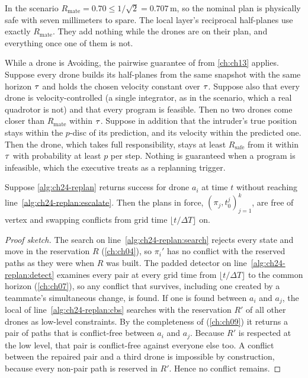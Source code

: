 In the scenario $R_{\mathrm{mate}} = 0.70 \le 1/\sqrt{2} = 0.707$\,m, so the
nominal plan is physically safe with seven millimeters to spare. The local
layer's reciprocal half-planes use exactly $R_{\mathrm{mate}}$. They add
nothing while the drones are on their plan, and everything once one of them
is not.

\begin{proposition}
\label{thm:ch24-orca}
While a drone is Avoiding, the pairwise guarantee of \orca
\cite{vandenberg2011orca} from \cref{ch:ch13} applies. Suppose every drone
builds its half-planes from the same snapshot with the same horizon $\tau$
and holds the chosen velocity constant over $\tau$. Suppose also that every
drone is velocity-controlled (a single integrator, as in the scenario, which
a real quadrotor is not) and that every program is feasible. Then no two
drones come closer than $R_{\mathrm{mate}}$ within $\tau$. Suppose in
addition that the intruder's true position stays within the $p$-disc of its
prediction, and its velocity within the predicted one. Then the drone, which
takes full responsibility, stays at least $R_{\mathrm{safe}}$ from it within
$\tau$ with probability at least $p$ per step. Nothing is guaranteed when a
program is infeasible, which the executive treats as a replanning trigger.
\end{proposition}

\begin{proposition}
\label{thm:ch24-replan}
Suppose \cref{alg:ch24-replan} returns success for drone $a_i$ at time $t$
without reaching line~\ref{alg:ch24-replan:escalate}. Then the plans in
force, $(\pi_j, t_0^j)_{j = 1}^k$, are free of vertex and swapping conflicts
from grid time $\lfloor t/\Delta T \rfloor$ on.
\end{proposition}
\begin{proof}[Proof sketch]
The search on line~\ref{alg:ch24-replan:search} rejects every state and
move in the reservation $R$ (\cref{ch:ch04}), so $\pi_i'$ has no conflict
with the reserved paths as they were when $R$ was built. The padded
detector on line~\ref{alg:ch24-replan:detect} examines every pair at every
grid time from $\lfloor t/\Delta T \rfloor$ to the common horizon
(\cref{ch:ch07}), so any conflict that survives, including one created by
a teammate's simultaneous change, is found. If one is found between $a_i$
and $a_j$, the local \cbs of line~\ref{alg:ch24-replan:cbs} searches with
the reservation $R'$ of all other drones as low-level constraints. By
the completeness of \cbs (\cref{ch:ch09}) it returns a pair of paths that is
conflict-free between $a_i$ and $a_j$. Because $R'$ is respected at the
low level, that pair is conflict-free against everyone else too. A conflict between the repaired pair and
a third drone is impossible by construction, because every non-pair path is
reserved in $R'$. Hence no conflict remains.
\end{proof}

